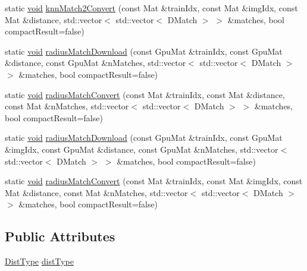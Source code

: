 \begin{DoxyCompactItemize}
\item 
static \hyperlink{legacy_8hpp_a8bb47f092d473522721002c86c13b94e}{void} \hyperlink{classcv_1_1gpu_1_1BruteForceMatcher__GPU__base_a64c5cf092af3a54d1377e88e315db390}{knn\-Match2\-Convert} (const Mat \&train\-Idx, const Mat \&img\-Idx, const Mat \&distance, std\-::vector$<$ std\-::vector$<$ D\-Match $>$ $>$ \&matches, bool compact\-Result=false)
\item 
static \hyperlink{legacy_8hpp_a8bb47f092d473522721002c86c13b94e}{void} \hyperlink{classcv_1_1gpu_1_1BruteForceMatcher__GPU__base_abcac467f36d216580a9d361bc37ba175}{radius\-Match\-Download} (const Gpu\-Mat \&train\-Idx, const Gpu\-Mat \&distance, const Gpu\-Mat \&n\-Matches, std\-::vector$<$ std\-::vector$<$ D\-Match $>$ $>$ \&matches, bool compact\-Result=false)
\item 
static \hyperlink{legacy_8hpp_a8bb47f092d473522721002c86c13b94e}{void} \hyperlink{classcv_1_1gpu_1_1BruteForceMatcher__GPU__base_aecea7deddb3792f0b11417d6453b1b20}{radius\-Match\-Convert} (const Mat \&train\-Idx, const Mat \&distance, const Mat \&n\-Matches, std\-::vector$<$ std\-::vector$<$ D\-Match $>$ $>$ \&matches, bool compact\-Result=false)
\item 
static \hyperlink{legacy_8hpp_a8bb47f092d473522721002c86c13b94e}{void} \hyperlink{classcv_1_1gpu_1_1BruteForceMatcher__GPU__base_a8b38a1b2aa263b764cb14bd287234f09}{radius\-Match\-Download} (const Gpu\-Mat \&train\-Idx, const Gpu\-Mat \&img\-Idx, const Gpu\-Mat \&distance, const Gpu\-Mat \&n\-Matches, std\-::vector$<$ std\-::vector$<$ D\-Match $>$ $>$ \&matches, bool compact\-Result=false)
\item 
static \hyperlink{legacy_8hpp_a8bb47f092d473522721002c86c13b94e}{void} \hyperlink{classcv_1_1gpu_1_1BruteForceMatcher__GPU__base_af2824e11a9e6119b0e313d07aef3e603}{radius\-Match\-Convert} (const Mat \&train\-Idx, const Mat \&img\-Idx, const Mat \&distance, const Mat \&n\-Matches, std\-::vector$<$ std\-::vector$<$ D\-Match $>$ $>$ \&matches, bool compact\-Result=false)
\end{DoxyCompactItemize}
\subsection*{Public Attributes}
\begin{DoxyCompactItemize}
\item 
\hyperlink{classcv_1_1gpu_1_1BruteForceMatcher__GPU__base_aed33fcc2dc26fe578648b63d1726b825}{Dist\-Type} \hyperlink{classcv_1_1gpu_1_1BruteForceMatcher__GPU__base_ab7c62ac82124e7910cd3f8529053ecdb}{dist\-Type}
\end{DoxyCompactItemize}


